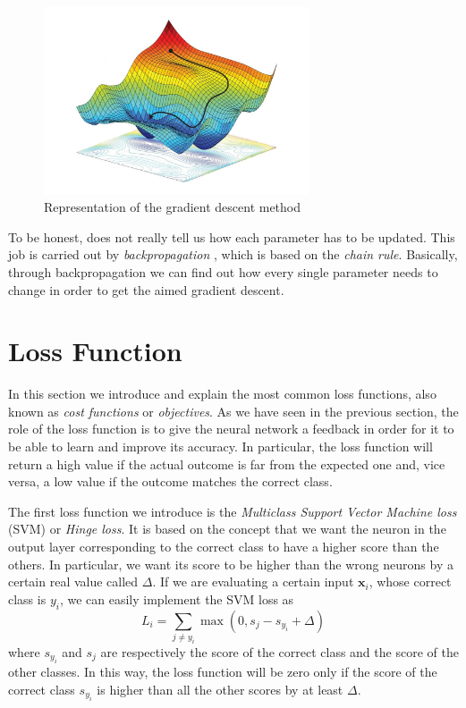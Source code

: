 \documentclass[12pt,a4paper]{report}
\theoremstyle{definition}
\begin{document}
\begin{figure}
    \centering
    \includegraphics[width=0.7\textwidth]{./Images/gradient_descent.pdf}
    \caption{Representation of the gradient descent method}
    \label{fig:gradient_descent}
\end{figure}

To be honest,  does not really tell us how each parameter has to be updated. This job is carried out by \emph{backpropagation} \cite{backprop}, which is based on the \emph{chain rule}. Basically, through backpropagation we can find out how every single parameter needs to change in order to get the aimed gradient descent.

\section{Loss Function}
\label{sec:loss}

In this section we introduce and explain the most common loss functions, also known as \emph{cost functions} or \emph{objectives}.
As we have seen in the previous section, the role of the loss function is to give the neural network a feedback in order for it to be able to learn and improve its accuracy.
In particular, the loss function will return a high value if the actual outcome is far from the expected one and, vice versa, a low value if the outcome matches the correct class.

The first loss function we introduce is the \emph{Multiclass Support Vector Machine loss} (SVM) or \emph{Hinge loss}.
It is based on the concept that we want the neuron in the output layer corresponding to the correct class to have a higher score than the others.
In particular, we want its score to be higher than the wrong neurons by a certain real value called $\Delta$.
If we are evaluating a certain input $\textbf{x}_i$, whose correct class is $y_i$, we can easily implement the SVM loss as
\begin{equation}
    L_i = \sum_{j \neq y_i} \max \left(0, s_j - s_{y_{i}} + \Delta \right)
    \label{eq:SVM}
\end{equation}
where $s_{y_{i}}$ and $s_j$ are respectively the score of the correct class and the score of the other classes. In this way, the loss function will be zero only if the score of the correct class $s_{y_{i}}$ is higher than all the other scores by at least $\Delta$.
\end{document}

